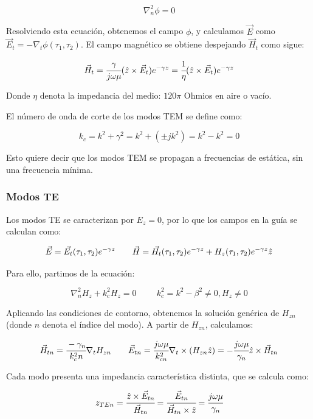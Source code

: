\documentclass[12pt]{article}
\begin{document}
$$\nabla^2_n \phi = 0$$

Resolviendo esta ecuaci\'on, obtenemos el campo $\phi$, y calculamos $\vec{E}$ como $\vec{E}_t = -\nabla_t \phi(\tau_1, \tau_2)$. El campo magn\'etico se obtiene despejando $\vec{H}_t$ como sigue:

$$\vec{H}_t = \cfrac{\gamma}{j\omega\mu}(\Hat{z} \times \vec{E}_t) e^{-\gamma z} = \cfrac{1}{\eta}(\Hat{z} \times \vec{E}_t) e^{-\gamma z}$$

Donde $\eta$ denota la impedancia del medio: $120\pi$ Ohmios en aire o vac\'io.

\vspace{0.5 cm}

El n\'umero de onda de corte de los modos TEM se define como:

$$k_c = k^2 + \gamma^2 = k^2 + (\pm jk^2) = k^2 - k^2 = 0$$

Esto quiere decir que los modos TEM se propagan a frecuencias de est\'atica, sin una frecuencia m\'inima.

\subsubsection{Modos TE}

Los modos TE se caracterizan por $E_z = 0$, por lo que los campos en la gu\'ia se calculan como:

$$\vec{E} = \vec{E_t}(\tau_1,\tau_2) e^{-\gamma z}
\hspace{7mm}
\vec{H} = \vec{H_t}(\tau_1,\tau_2) e^{-\gamma z} + H_z(\tau_1,\tau_2) e^{-\gamma z}\hat{z}$$

Para ello, partimos de la ecuaci\'on:

$$\nabla^2 _n H_z + k_c^2 H_z = 0 \hspace{1cm} k_c^2 = k^2 - \beta^2 \neq 0, H_z \neq 0$$

Aplicando las condiciones de contorno, obtenemos la soluci\'on gen\'erica de $H_{zn}$ (donde $n$ denota el \'indice del modo). A partir de $H_{zn}$, calculamos:

$$\vec{H}_{tn} = \cfrac{-\gamma_n}{k^2_cn}\nabla_t H_{zn}
\hspace{7mm}
\vec{E}_{tn} = \cfrac{j\omega\mu}{k^2_{cn}} \nabla_t \times (H_{zn}\hat{z}) = -\cfrac{j\omega\mu}{\gamma_n}\hat{z} \times \vec{H}_{tn}$$

Cada modo presenta una impedancia caracter\'istica distinta, que se calcula como:

$$z_{TEn} = \cfrac{\hat{z} \times \vec{E}_{tn}}{\vec{H}_{tn}} = \cfrac{\vec{E}_{tn}}{\vec{H}_{tn} \times \hat{z}} = \cfrac{j\omega\mu}{\gamma_n}$$
\end{document}

